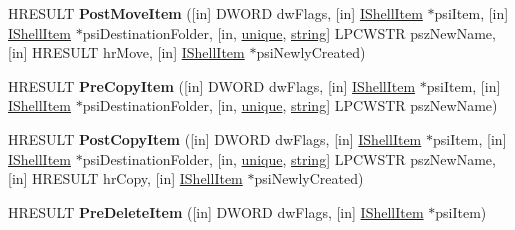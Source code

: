 \begin{DoxyCompactItemize}
\item 
\mbox{\label{interface_i_file_operation_progress_sink_adc72b27000b92580b17cbf6a70fcd9cc}} 
H\+R\+E\+S\+U\+LT {\bfseries Post\+Move\+Item} (\mbox{[}in\mbox{]} D\+W\+O\+RD dw\+Flags, \mbox{[}in\mbox{]} \hyperlink{interface_i_shell_item}{I\+Shell\+Item} $\ast$psi\+Item, \mbox{[}in\mbox{]} \hyperlink{interface_i_shell_item}{I\+Shell\+Item} $\ast$psi\+Destination\+Folder, \mbox{[}in, \hyperlink{interfaceunique}{unique}, \hyperlink{structstring}{string}\mbox{]} L\+P\+C\+W\+S\+TR psz\+New\+Name, \mbox{[}in\mbox{]} H\+R\+E\+S\+U\+LT hr\+Move, \mbox{[}in\mbox{]} \hyperlink{interface_i_shell_item}{I\+Shell\+Item} $\ast$psi\+Newly\+Created)
\item 
\mbox{\label{interface_i_file_operation_progress_sink_ae63c48fa7461b9078d9fae725da53e18}} 
H\+R\+E\+S\+U\+LT {\bfseries Pre\+Copy\+Item} (\mbox{[}in\mbox{]} D\+W\+O\+RD dw\+Flags, \mbox{[}in\mbox{]} \hyperlink{interface_i_shell_item}{I\+Shell\+Item} $\ast$psi\+Item, \mbox{[}in\mbox{]} \hyperlink{interface_i_shell_item}{I\+Shell\+Item} $\ast$psi\+Destination\+Folder, \mbox{[}in, \hyperlink{interfaceunique}{unique}, \hyperlink{structstring}{string}\mbox{]} L\+P\+C\+W\+S\+TR psz\+New\+Name)
\item 
\mbox{\label{interface_i_file_operation_progress_sink_aa0d997dabd18ff6abef662160f6f1577}} 
H\+R\+E\+S\+U\+LT {\bfseries Post\+Copy\+Item} (\mbox{[}in\mbox{]} D\+W\+O\+RD dw\+Flags, \mbox{[}in\mbox{]} \hyperlink{interface_i_shell_item}{I\+Shell\+Item} $\ast$psi\+Item, \mbox{[}in\mbox{]} \hyperlink{interface_i_shell_item}{I\+Shell\+Item} $\ast$psi\+Destination\+Folder, \mbox{[}in, \hyperlink{interfaceunique}{unique}, \hyperlink{structstring}{string}\mbox{]} L\+P\+C\+W\+S\+TR psz\+New\+Name, \mbox{[}in\mbox{]} H\+R\+E\+S\+U\+LT hr\+Copy, \mbox{[}in\mbox{]} \hyperlink{interface_i_shell_item}{I\+Shell\+Item} $\ast$psi\+Newly\+Created)
\item 
\mbox{\label{interface_i_file_operation_progress_sink_af197bd846e3770d0fbdaac6101d8b37f}} 
H\+R\+E\+S\+U\+LT {\bfseries Pre\+Delete\+Item} (\mbox{[}in\mbox{]} D\+W\+O\+RD dw\+Flags, \mbox{[}in\mbox{]} \hyperlink{interface_i_shell_item}{I\+Shell\+Item} $\ast$psi\+Item)
\item 

\end{DoxyCompactItemize}
